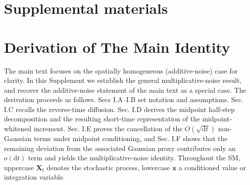 \documentclass[
 longbibliography,
 twocolumn,
 superscriptaddress,
 amsmath,
 amssymb,
 amsthm,
 amsfonts,
 prl,
 floatfix,
]{revtex4-2}
\def\dbar{{\mathchar'26\mkern-12mu d}}
\newcommand{\intcal}[1]{{#1}^{\intercal}}
\newcommand{\matbf}[1]{\boldsymbol{\mathsf{#1}}}
\newcommand{\todo}[1]{\textbf{\textcolor{red}{#1}}}
\begin{document}
\newpage
\begin{widetext}

\setcounter{secnumdepth}{3}





\setcounter{equation}{0}
\setcounter{figure}{0}
\setcounter{table}{0}
\setcounter{page}{1}

\renewcommand{\theequation}{S\arabic{equation}}
\renewcommand{\theHequation}{S\arabic{equation}}
\renewcommand{\thefigure}{S\arabic{figure}}
\renewcommand{\theHfigure}{S\arabic{figure}}

\section*{Supplemental materials}

\section{Derivation of The Main Identity}
\vspace*{-0.3\baselineskip}
The main text focuses on the spatially homogeneous (additive-noise) case for clarity. In this Supplement we establish the general multiplicative-noise result, and recover the additive-noise statement of the main text as a special case.
The derivation proceeds as follows. Secs I.A--I.B set notation and assumptions. Sec. I.C recalls the reverse-time diffusion. Sec. I.D derives the midpoint half-step decomposition and the resulting short-time representation of the midpoint-whitened increment. Sec. I.E proves the cancellation of the $O(\sqrt{\mathrm dt})$ non-Gaussian terms under midpoint conditioning, and Sec. I.F shows that the remaining deviation from the associated Gaussian proxy contributes only an $o(\mathrm dt)$ term and yields the multiplicative-noise identity. Throughout the SM, uppercase $\bm X_t$ denotes the stochastic process, lowercase $\bm x$ a conditioned value or integration variable.

\vspace*{-0.5\baselineskip}

\end{widetext}
\end{document}
